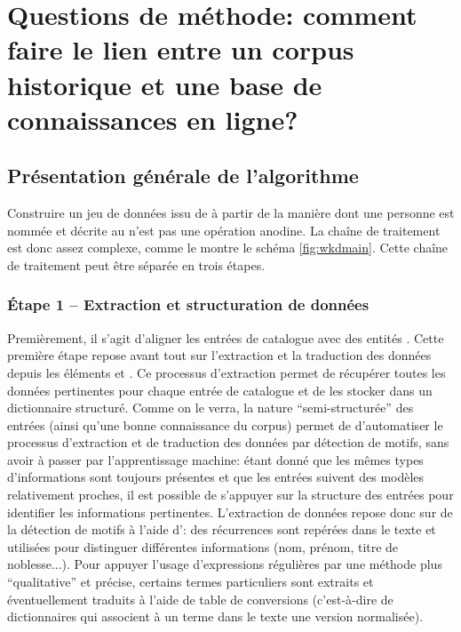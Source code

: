 \section{Questions de méthode: comment faire le lien entre un corpus historique et une base de connaissances en ligne?}
\subsection{Présentation générale de l'algorithme}
Construire un jeu de données issu de \sparql{} à partir de la manière dont une personne est nommée et décrite au  n'est pas une opération anodine. La chaîne de traitement est donc assez complexe, comme le montre le schéma \ref{fig:wkdmain}. Cette chaîne de traitement peut être séparée en trois étapes.

\subsubsection{Étape 1 -- Extraction et structuration de données}
Premièrement, il s'agit d'aligner les entrées de catalogue avec des entités \wkd{}. Cette première étape repose avant tout sur l'extraction et la traduction des données depuis les éléments \tname{} et \ttrait{}. Ce processus d'extraction permet de récupérer toutes les données pertinentes pour chaque entrée de catalogue et de les stocker dans un \gls{dictionnaire} structuré. Comme on le verra, la nature \enquote{semi-structurée} des entrées (ainsi qu'une bonne connaissance du corpus) permet de d'automatiser le processus d'extraction et de traduction des données par détection de motifs, sans avoir à passer par l'apprentissage machine: étant donné que les mêmes types d'informations sont toujours présentes et que les entrées suivent des modèles relativement proches, il est possible de s'appuyer sur la structure des entrées pour identifier  les informations pertinentes. L'extraction de données repose donc sur de la détection de motifs à l'aide d'\rgxpl{}: des récurrences sont repérées dans le texte et utilisées pour distinguer différentes informations (nom, prénom, titre de noblesse...). Pour appuyer l'usage d'expressions régulières par une méthode plus \enquote{qualitative} et précise, certains termes particuliers sont extraits et éventuellement traduits à l'aide de \glspl{table de conversion} (c'est-à-dire de \glspl{dictionnaire} qui associent à un terme dans le texte une version normalisée). 

